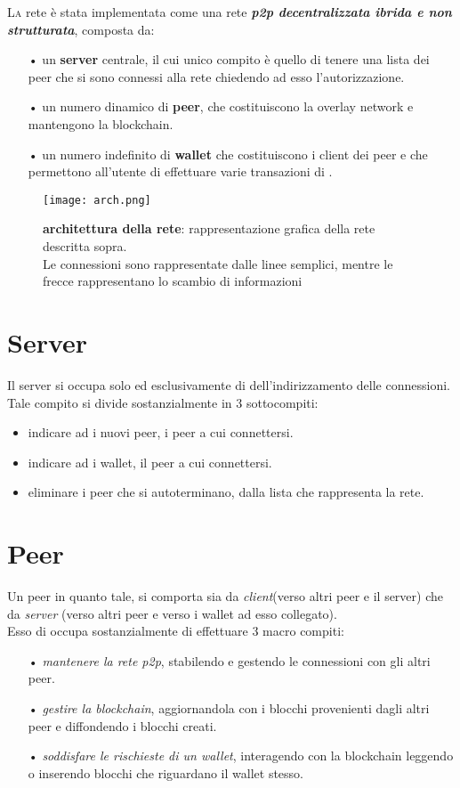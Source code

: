 \lettrine{L}{a} rete è stata implementata come una rete  \textbf{\textit{p2p decentralizzata ibrida e non strutturata}}, composta da:
\begin{itemize}
\item[•] un \textbf{server} centrale, il cui unico compito è quello di tenere una lista dei peer che si sono connessi alla rete chiedendo ad esso l'autorizzazione.
\item[•] un numero dinamico di \textbf{peer}, che costituiscono la overlay network e mantengono la blockchain. 
\item[•] un numero indefinito di \textbf{wallet} che costituiscono i client dei peer e che permettono all'utente di effettuare varie transazioni di \vitcoin.
\end{itemize}

\begin{SCfigure}
  \centering
  \texttt{[image: arch.png]}    
  \caption[architettura della rete]{\textbf{architettura della rete}: rappresentazione grafica della rete descritta sopra.\\ Le connessioni sono rappresentate dalle linee semplici, mentre le frecce rappresentano lo scambio di informazioni}
\end{SCfigure}

\section{Server}
Il server si occupa solo ed esclusivamente di dell'indirizzamento delle connessioni. Tale compito si divide sostanzialmente in 3 sottocompiti:
\begin{itemize}
\item indicare ad i nuovi peer, i peer a cui connettersi.
\item indicare ad i wallet, il peer a cui connettersi.
\item eliminare i peer che si autoterminano, dalla lista che rappresenta la rete.
\end{itemize}
 
\section{Peer}
Un peer in quanto tale, si comporta sia da \textit{client}(verso altri peer e il server) che da \textit{server} (verso altri peer e verso i wallet ad esso collegato).\\ Esso di  occupa sostanzialmente di effettuare 3 macro compiti:
\begin{itemize}
\item[•] \textit{mantenere la rete p2p}, stabilendo e gestendo le connessioni con gli altri peer.
\item[•] \textit{gestire la blockchain}, aggiornandola con i blocchi provenienti dagli altri peer e diffondendo i blocchi creati.
\item[•] \textit{soddisfare le rischieste di un wallet}, interagendo  con la blockchain leggendo o inserendo blocchi che riguardano il wallet stesso. 
\end{itemize}

